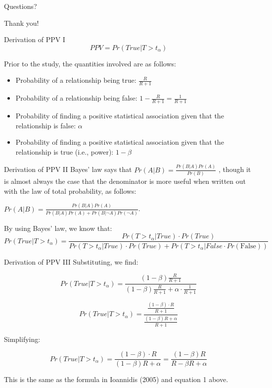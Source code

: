 \documentclass{beamer}
\begin{document}
\begin{frame}
\begin{center}
Questions?
\vspace{1in}


\Huge{Thank you!}
\end{center}
\end{frame}



\begin{frame}[label=derive]{Derivation of PPV I}
\[PPV = Pr(True|T > t_{\alpha})\]

Prior to the study, the quantities involved are as follows:

\begin{itemize}
\item
  Probability of a relationship being true: \(\frac{R}{R + 1}\)
\item
  Probability of a relationship being false:
  \(1 - \frac{R}{R + 1} = \frac{1}{R + 1}\)
\item
  Probability of finding a positive statistical association given that
  the relationship is false: \(\alpha\)
\item
  Probability of finding a positive statistical association given that
  the relationship is true (i.e., power): \(1 - \beta\)
\end{itemize}
\end{frame}

\begin{frame}[label=derive]{Derivation of PPV II}
Bayes' law says that \(Pr(A|B) = \frac{Pr(B|A)Pr(A)}{Pr(B)}\) , though
it is almost always the case that the denominator is more useful when
written out with the law of total probability, as follows:

\(Pr(A|B) = \frac{Pr(B|A)Pr(A)}{Pr(B|A)Pr(A) + Pr(B|\neg A)Pr(\neg A)}\).

By using Bayes' law, we know that:
\tiny{
\[Pr(True|T > t_{\alpha}) = \frac{Pr(T > t_{\alpha}|True) \cdot Pr(True)}{Pr(T > t_{\alpha}|True) \cdot Pr(True) + Pr(T > t_{\alpha}|False \cdot Pr\left( \text{False} \right))}\]}
\end{frame}

\begin{frame}[label=derive]{Derivation of PPV III}
Substituting, we find:

\[Pr(True|T > t_{\alpha}) = \frac{(1 - \beta)\frac{R}{R + 1}}{(1 - \beta)\frac{R}{R + 1} + \alpha \cdot \frac{1}{R + 1}}\]

\[Pr(True|T > t_{\alpha}) = \frac{\frac{(1 - \beta) \cdot R}{R + 1}}{\frac{(1 - \beta)R + \alpha}{R + 1}}\]

Simplifying:

\[Pr(True|T > t_{\alpha}) = \frac{(1 - \beta) \cdot R}{(1 - \beta)R + \alpha} = \frac{(1 - \beta)R}{R - \beta R + \alpha}\]

This is the same as the formula in Ioannidis (2005) and equation 1
above.
\hyperlink{Ioannidis}{}
\end{frame}
\end{document}
